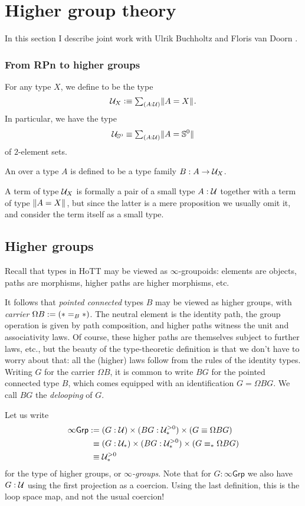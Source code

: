 \chapter{Higher group theory}
In this section I describe joint work with Ulrik Buchholtz and Floris van Doorn \cite{highergroups}.

\subsection{From RPn to higher groups}
\begin{defn}
For any type $X$, we define  to be the type \[\UU_X\defeq\sm{A:\UU}\brck{A=X}.\] In particular, we have the type \[\UU_{\sphere{0}}\jdeq\sm{A:\UU}\brck{A={\sphere{0}}}\] of $2$\nobreakdash-element sets.

An  over a type $A$ is defined to be a type family $B:A\to\mathcal{U}_X$. 
\end{defn}

A term of type $\mathcal{U}_X$ is formally a pair of a small type $A:\mathcal{U}$ together with a term of type $\Vert A=X\Vert_{}$, but since the latter is a mere proposition we usually omit it, and consider the term itself as a small type.

\section{Higher groups}
\label{sec:higher-groups}

Recall that types in HoTT may be viewed as $\infty$-groupoids:
elements are objects, paths are morphisms, higher paths are higher
morphisms, etc.

It follows that \emph{pointed connected} types $B$ may be viewed as higher
groups, with \emph{carrier} $\Omega B := (\ast =_B \ast)$.
The neutral element is the identity path,
the group operation is given by path composition,
and higher paths witness the unit and associativity laws.
Of course, these higher paths are themselves subject to further laws,
etc., but the beauty of the type-theoretic definition is
that we don't have to worry about that:
all the (higher) laws follow from the rules of the identity types.
Writing $G$ for the carrier $\Omega B$, it is common to write $BG$ for the pointed
connected type $B$, which comes equipped with an identification $G = \Omega BG$.
We call $BG$ the \emph{delooping} of $G$.

Let us write
\begin{align*}
  \infty\mathsf{Grp}
  &:= (G : \mathcal{U}) \times (BG : \mathcal{U}_\ast^{>0}) \times (G \equiv \Omega BG) \\
  &\phantom{:}\equiv (G : \mathcal{U}_\ast) \times (BG : \mathcal{U}_\ast^{>0}) \times (G \equiv_\ast \Omega BG) \\
  &\phantom{:}\equiv \mathcal{U}_\ast^{>0}
\end{align*}
for the type of higher groups, or \emph{$\infty$-groups}.
Note that for $G:\infty\mathsf{Grp}$
we also have $G:\mathcal{U}$ using the first projection as a coercion. Using
the last definition, this is the loop space map, and not the usual coercion!

